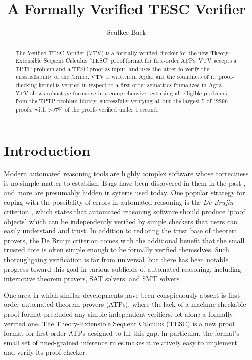 \documentclass[12pt]{article}
\title{A Formally Verified TESC Verifier}
\author{Seulkee Baek}
\begin{document}
\maketitle

\begin{abstract}

The Verified TESC Verifier (VTV) is a formally verified checker for the new 
Theory-Extensible Sequent Calculus (TESC) proof format for first-order ATPs. 
VTV accepts a TPTP problem and a TESC proof as input, and uses the latter to 
verify the unsatisfiability of the former. VTV is written in Agda, and the 
soundness of its proof-checking kernel is verified in respect to a first-order
semantics formalized in Agda. VTV shows robust performance in a comprehensive 
test using all elligible problems from the TPTP problem library, successfully 
verifying all but the largest 5 of 12296 proofs, with >97\% of the 
proofs verified under 1 second. 

\end{abstract}

\section{Introduction}

Modern automated reasoning tools are highly complex software whose correctness 
is no simple matter to establish. Bugs have been discovered in them in the past 
\cite{reger2017testing,harrison2006towards}, and more are presumably hidden in 
sytems used today. One popular strategy for coping with the possibility of errors 
in automated reasoning is the \textit{De Brujin} criterion \cite{barendregt2005challenge}, 
which states that automated reasoning software should produce `proof objects' which can be 
independently verified by simple checkers that users can easily understand 
and trust. In addition to reducing the trust base of theorem provers, 
the De Bruijn criterion comes with the additional benefit that the 
small trusted core is often simple enough to be formally verified themselves. 
Such thoroughgoing verification is far from universal, but there has been notable 
progress toward this goal in various subfields of automated reasoning, including 
interactive theorem provers, SAT solvers, and SMT solvers.

One area in which similar developments have been conspicuously absent is 
first-order automated theorem provers (ATPs), where the lack of a machine-checkable
proof format \cite{reger2017checkable} precluded any simple independent verifiers, 
let alone a formally verified one. The Theory-Extensible Sequent Calculus (TESC) is a new 
proof format for first-order ATPs designed to fill this gap. In particular,
the format's small set of fined-grained inference rules makes it relatively 
easy to implement and verify its proof checker.
\end{document}
